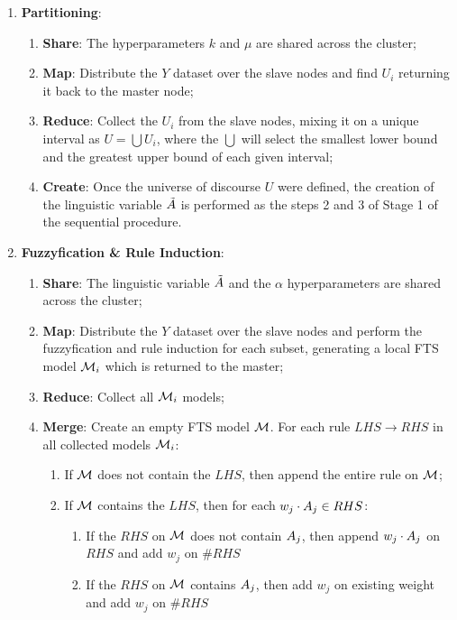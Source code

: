 \begin{enumerate}
    \item \textbf{Partitioning}:
    \begin{enumerate}
        \item \textbf{Share}: The hyperparameters $k$ and $\mu$ are shared across the cluster; 
        \item \textbf{Map}: Distribute the $Y$ dataset over the slave nodes and find $U_i$ returning it back to the master node;
        \item \textbf{Reduce}: Collect the $U_i$ from the slave nodes, mixing it on a unique interval as $U = \bigcup U_i$, where the $\bigcup$ will select the smallest lower bound and the greatest upper bound of each given interval;
        \item \textbf{Create}: Once the universe of discourse $U$ were defined, the creation of the linguistic variable $\tilde{A}$ is performed as the steps 2 and 3 of Stage 1 of the sequential procedure. 
    \end{enumerate}
    
    \item \textbf{Fuzzyfication \& Rule Induction}:
    \begin{enumerate}
        \item \textbf{Share}: The linguistic variable $\tilde{A}$ and the $\alpha$ hyperparameters are shared across the cluster;
        \item \textbf{Map}: Distribute the $Y$ dataset over the slave nodes and perform the fuzzyfication and rule induction for each subset, generating a local FTS model $\mathcal{M}_i$ which is returned to the master; 
        \item \textbf{Reduce}: Collect all $\mathcal{M}_i$ models; 
        \item \textbf{Merge}: Create an empty FTS model $\mathcal{M}$. For each rule $LHS \rightarrow RHS$ in all collected models $\mathcal{M}_i$:
        \begin{enumerate}
            \item If $\mathcal{M}$ does not contain the $LHS$, then append the entire rule on $\mathcal{M}$;
            \item If $\mathcal{M}$ contains the $LHS$, then for each $w_j \cdot A_j \in RHS$:
            \begin{enumerate}
            \item If the $RHS$ on $\mathcal{M}$ does not contain $A_j$, then append $w_j \cdot A_j$ on $RHS$ and add $w_j$ on $\#RHS$
            \item If the $RHS$ on $\mathcal{M}$ contains $A_j$, then add $w_j$ on existing weight and add $w_j$ on $\#RHS$
            \end{enumerate}
        \end{enumerate}
    \end{enumerate}
\end{enumerate}


